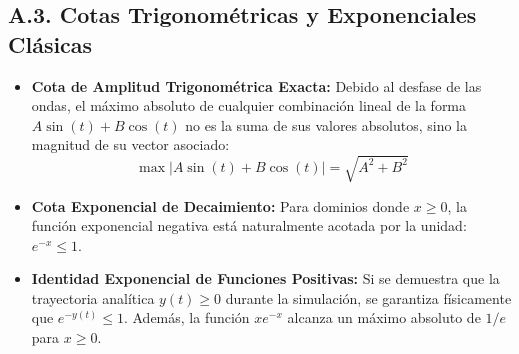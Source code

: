 \documentclass[12pt]{article}
\begin{document}
\subsection*{A.3. Cotas Trigonométricas y Exponenciales Clásicas}
\begin{itemize}
    \item \textbf{Cota de Amplitud Trigonométrica Exacta:} Debido al desfase de las ondas, el máximo absoluto de cualquier combinación lineal de la forma $A\sin(t) + B\cos(t)$ no es la suma de sus valores absolutos, sino la magnitud de su vector asociado:
    \begin{equation}
        \max |A\sin(t) + B\cos(t)| = \sqrt{A^2 + B^2}
    \end{equation}
    \item \textbf{Cota Exponencial de Decaimiento:} Para dominios donde $x \ge 0$, la función exponencial negativa está naturalmente acotada por la unidad: $e^{-x} \le 1$.
    \item \textbf{Identidad Exponencial de Funciones Positivas:} Si se demuestra que la trayectoria analítica $y(t) \ge 0$ durante la simulación, se garantiza físicamente que $e^{-y(t)} \le 1$. Además, la función $x e^{-x}$ alcanza un máximo absoluto de $1/e$ para $x \ge 0$.
\end{itemize}
\end{document}
